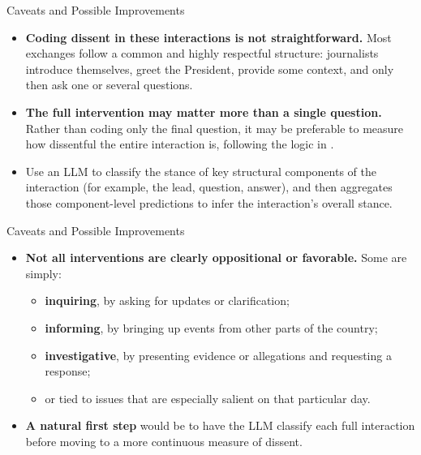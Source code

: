 \documentclass[10pt,aspectratio=169]{beamer}
\begin{document}
\begin{frame}{Caveats and Possible Improvements}
\small
\begin{itemize}\setlength\itemsep{0.7em}
    \item \textbf{Coding dissent in these interactions is not straightforward.}
    Most exchanges follow a common and highly respectful structure: journalists introduce themselves, greet the President, provide some context, and only then ask one or several questions.

    \item \textbf{The full intervention may matter more than a single question.}
    Rather than coding only the final question, it may be preferable to measure how dissentful the entire interaction is, following the logic in \citep{lee2025journalism}. 
    \item Use an LLM to classify the stance of key structural components of the interaction (for example, the lead, question, answer), and then aggregates those component-level predictions to infer the interaction’s overall stance.

\end{itemize}
\end{frame}

\begin{frame}{Caveats and Possible Improvements}
\small
\begin{itemize}\setlength\itemsep{0.7em}

    \item \textbf{Not all interventions are clearly oppositional or favorable.}
    Some are simply:
    \begin{itemize}
        \item \textbf{inquiring}, by asking for updates or clarification;
        \item \textbf{informing}, by bringing up events from other parts of the country;
        \item \textbf{investigative}, by presenting evidence or allegations and requesting a response;
        \item or tied to issues that are especially salient on that particular day.
    \end{itemize}

    \item \textbf{A natural first step} would be to have the LLM classify each full interaction before moving to a more continuous measure of dissent.
\end{itemize}
\end{frame}







\begin{frame}[allowframebreaks]
    
    \typeout{}

    \singlespacing
    
    
    
\end{frame}
\end{document}

